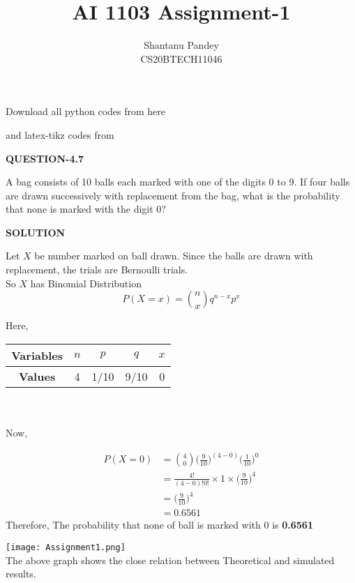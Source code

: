 \documentclass[a4paper]{article}
\title{AI 1103 Assignment-1}
\author{Shantanu Pandey\\ CS20BTECH11046}
\date{}
\begin{document}
\maketitle
\noindent
Download all python codes from here

\begin{multicols*}{2}
\noindent
{}
    
\vspace{0.3cm}
and latex-tikz codes from  

\vspace{0.3cm}  
    
   
\vspace{0.5cm}
\textbf{QUESTION-4.7}
\vspace{0.5cm} 

A bag consists of 10 balls each marked with
one of the digits 0 to 9. If four balls are drawn
successively with replacement from the bag,
what is the probability that none is marked
with the digit 0?

\vspace{0.5cm}
\textbf{SOLUTION}
\vspace{0.5cm} 

\vspace{0.3cm}

Let $X$ be number marked on ball drawn.
Since the balls are drawn with replacement, the trials are Bernoulli trials.
\\
So $X$ has Binomial Distribution 
\begin{equation}
    P(X=x)=\binom{n}{x}q^{n-x}p^{x} 
\end{equation} 

Here,\\

\begin{tabular}{|c|c|c|c|c|}
\hline
\textbf{Variables} & $n$ & $p$    & $q$    & $x$          \\ \hline
\textbf{Values}    & 4 & 1/10 & 9/10 & 0 \\ \hline
\end{tabular}
\\\\
Now,

\begin{align}
P(X=0) &= \binom{4}{0} \bigg(\frac{9}{10}\bigg)^{(4-0)} \bigg(\frac{1}{10}\bigg)^{0} \\
&=\frac{4!}{(4-0)! 0!} \times 1 \times \bigg(\frac{9}{10}\bigg)^{4} \\
&=\bigg( \frac{9}{10}\bigg) ^{4} \\
&= 0.6561
\end{align}
Therefore, The probability that none of ball is marked with $0$ is \textbf{0.6561}

\texttt{[image: Assignment1.png]}\\
 The above graph shows the close relation between Theoretical and simulated results.

\end{multicols*}
\end{document}
